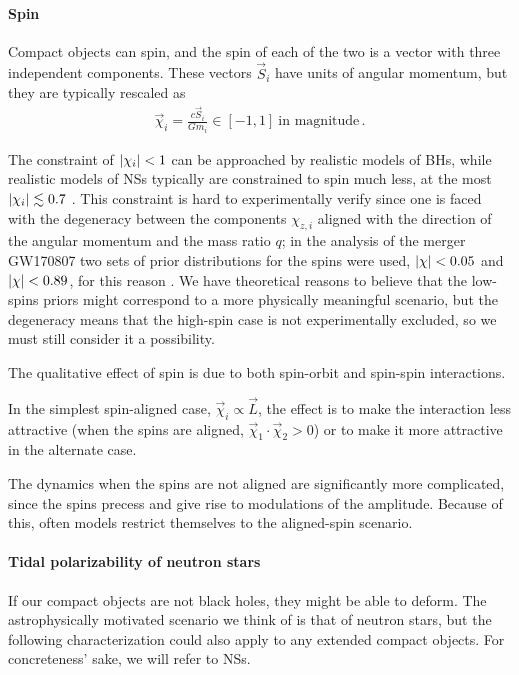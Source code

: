 \documentclass[main.tex]{subfiles}
\begin{document}
\paragraph{Spin}

Compact objects can spin, and the spin of each of the two is a vector with three independent components. 
These vectors \(\vec{S}_i\) have units of angular momentum, but they are typically rescaled as 
%
\begin{align}
\vec{\chi}_i = \frac{c\vec{S}_i}{G m_i} \in [-1, 1] 
\ \text{in magnitude}
\,.
\end{align}

The constraint of \(\abs{\chi_i} < 1\) can be approached by realistic models of \acsp{BH}, while realistic models of \acsp{NS} typically are constrained to spin much less, at the most \(\abs{\chi _i} \lesssim 0.7\) \cite{loSPINPARAMETERUNIFORMLY2011}.
This constraint is hard to experimentally verify since one is faced with the degeneracy between the components \(\chi_{z,i}\) aligned with the direction of the angular momentum and the mass ratio \(q\); in the analysis of the merger GW170807 two sets of prior distributions for the spins were used, \(\abs{\chi } < 0.05\) and \(\abs{\chi } < 0.89\), for this reason \cite{abbottGW170817ObservationGravitational2017}. We have theoretical reasons to believe that the low-spins priors might correspond to a more physically meaningful scenario, but the degeneracy means that the high-spin case is not experimentally excluded, so we must still consider it a possibility.

The qualitative effect of spin is due to both spin-orbit and spin-spin interactions. 

In the simplest spin-aligned case, \(\vec{\chi}_i \propto \vec{L} \), the effect is to make the interaction less attractive (when the spins are aligned, \(\vec{\chi}_1 \cdot \vec{\chi}_2 > 0\)) or to make it more attractive in the alternate case. 

The dynamics when the spins are not aligned are significantly more complicated, since the spins precess and give rise to modulations of the amplitude. 
Because of this, often models restrict themselves to the aligned-spin scenario. 

\paragraph{Tidal polarizability of neutron stars}

If our compact objects are not black holes, they might be able to deform. The astrophysically motivated scenario we think of is that of neutron stars, but the following characterization could also apply to any extended compact objects. For concreteness' sake, we will refer to \acsp{NS}. 
\end{document}
